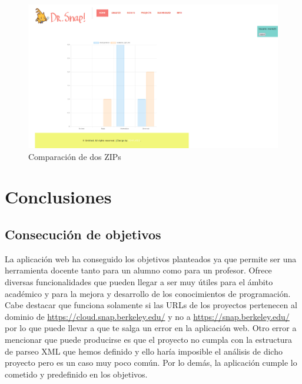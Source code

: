 \documentclass[a4paper, 12pt]{book}
\begin{document}
\begin{figure}[h]
            \centering
           \includegraphics[scale=0.35]{img/comparar-ej.png}
            \caption{Comparación de dos ZIPs}
             \label{figura:zips-pr}
        \end{figure}



\cleardoublepage
\chapter{Conclusiones}
\label{chap:conclusiones}


\section{Consecución de objetivos}
\label{sec:consecucion-objetivos}
La aplicación web ha conseguido los objetivos planteados ya que permite ser una herramienta docente tanto para un alumno como para un profesor. Ofrece diversas funcionalidades que pueden llegar a ser muy útiles para el ámbito académico y para la mejora y desarrollo de los conocimientos de programación. Cabe destacar que funciona solamente si las URLs de los proyectos pertenecen al dominio de \url{https://cloud.snap.berkeley.edu/} y no a \url{https://snap.berkeley.edu/} por lo que puede llevar a que te salga un error en la aplicación web. Otro error a mencionar que puede producirse es que el proyecto no cumpla con la estructura de parseo XML que hemos definido y ello haría imposible el análisis de dicho proyecto pero es un caso muy poco común. Por lo demás, la aplicación cumple lo cometido y predefinido en los objetivos.
\end{document}
